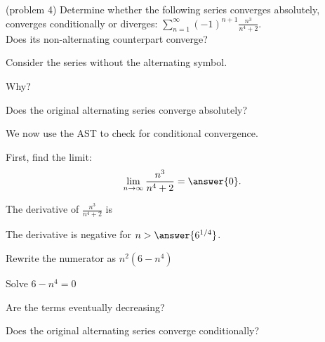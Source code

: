 \documentclass[handout]{ximera}
\begin{document}
\begin{problem}(problem 4)
Determine whether the following series converges absolutely, converges conditionally or diverges: $\displaystyle{\sum_{n=1}^\infty (-1)^{n+1} \frac{n^3}{n^4 + 2}}$.\\
Does its non-alternating counterpart converge?
\begin{hint} 
Consider the series without the alternating symbol.
\end{hint}
\begin{multipleChoice}
\end{multipleChoice}

Why?
\begin{multipleChoice}
\end{multipleChoice}




Does the original alternating series converge absolutely?
\begin{multipleChoice}
\end{multipleChoice}

We now use the AST to check for conditional convergence.

First, find the limit:
\[
\lim_{n\to\infty} \frac{n^3}{n^4 + 2} = \answer{0}.
\]

The derivative of $\displaystyle{\frac{n^3}{n^4 + 2}}$ is  

\begin{multipleChoice}
\end{multipleChoice}


The derivative is negative for $n > \answer{6^{1/4}}$.
\begin{hint}
Rewrite the numerator as $n^2(6-n^4)$
\end{hint}
\begin{hint}
Solve $6 - n^4 = 0$
\end{hint}

Are the terms eventually decreasing?
\begin{multipleChoice}
\end{multipleChoice}


Does the original alternating series converge conditionally?
\begin{multipleChoice}
\end{multipleChoice}


\end{problem}
\end{document}
